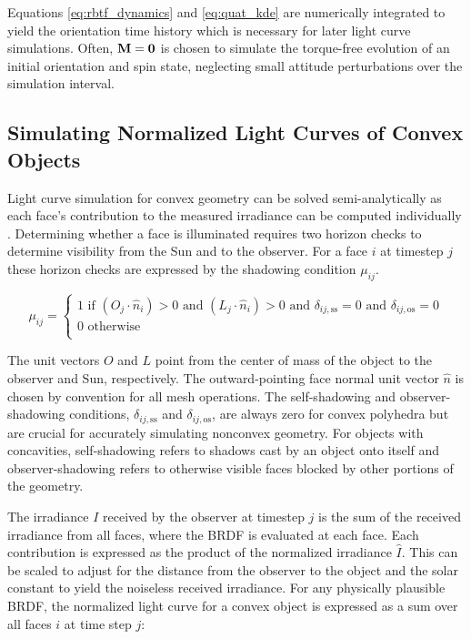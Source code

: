 Equations \ref{eq:rbtf_dynamics} and \ref{eq:quat_kde} are numerically integrated to yield the orientation time history which is necessary for later light curve simulations. Often, $\mathbf{M} = \mathbf{0}$ is chosen to simulate the torque-free evolution of an initial orientation and spin state, neglecting small attitude perturbations over the simulation interval.

\subsection{Simulating Normalized Light Curves of Convex Objects}

Light curve simulation for convex geometry can be solved semi-analytically as each face's contribution 
to the measured irradiance can be computed individually \cite{kaasalainen2001}. 
Determining whether a face is illuminated requires two horizon checks to determine visibility 
from the Sun and to the observer. For a face $i$ at timestep $j$ these horizon checks are 
expressed by the shadowing condition $\mu_{ij}$. 

\begin{equation} \label{eq:cvx_shadow_cond}
  \mu_{ij} = \begin{cases}
    1 \text{ if } \left( O_j \cdot \hat{n}_i \right) > 0 \text{ and } \left( L_j \cdot \hat{n}_i \right) > 0 
	  \text{ and } \delta_{ij,\text{ss}} = 0 \text{ and } \delta_{ij,\text{os}} = 0\\
    0 \text{ otherwise } \\
  \end{cases}
\end{equation}

The unit vectors $O$ and $L$ point from the center of mass of the object to the observer and Sun, respectively. The outward-pointing face normal unit vector $\hat{n}$ is chosen by convention for all mesh operations. 
The self-shadowing and observer-shadowing conditions, $\delta_{ij,\text{ss}}$ and $\delta_{ij,\text{os}}$, 
are always zero for convex polyhedra but are crucial for accurately simulating nonconvex geometry. 
For objects with concavities, self-shadowing refers to shadows cast by an object onto itself and observer-shadowing 
refers to otherwise visible faces blocked by other portions of the geometry.

The irradiance $I$ received by the observer at timestep $j$ is the sum of the received irradiance from all faces, where the BRDF is evaluated at each face. Each contribution is expressed as the product of the
normalized irradiance $\hat{I}$. This can be scaled to adjust for the distance from the observer to
the object and the solar constant to yield the noiseless received irradiance. For any physically plausible BRDF, the normalized light curve for a convex object is expressed as a sum over all faces $i$ at time step $j$:

